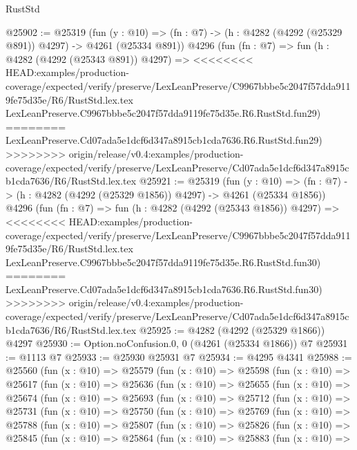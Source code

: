 \begin{lexlean}{RustStd}
\begin{coremodule}
{\begin{coremodule}
{{{{{{{{{{{{{{{{{{{{{{{{{{{{{{{{{{{@25902 := @25319
    (fun (y : @10) => (fn : @7) -> (h : @4282 (@4292 (@25329 @891)) @4297) -> @4261 (@25334 @891))
    @4296
    (fun (fn : @7) =>
    fun (h : @4282 (@4292 (@25343 @891)) @4297) =>
<<<<<<<< HEAD:examples/production-coverage/expected/verify/preserve/LexLeanPreserve/C9967bbbe5c2047f57dda9119fe75d35e/R6/RustStd.lex.tex
    LexLeanPreserve.C9967bbbe5c2047f57dda9119fe75d35e.R6.RustStd.fun29)
========
    LexLeanPreserve.Cd07ada5e1dcf6d347a8915cb1cda7636.R6.RustStd.fun29)
>>>>>>>> origin/release/v0.4:examples/production-coverage/expected/verify/preserve/LexLeanPreserve/Cd07ada5e1dcf6d347a8915cb1cda7636/R6/RustStd.lex.tex
@25921 := @25319
    (fun (y : @10) => (fn : @7) -> (h : @4282 (@4292 (@25329 @1856)) @4297) -> @4261 (@25334 @1856))
    @4296
    (fun (fn : @7) =>
    fun (h : @4282 (@4292 (@25343 @1856)) @4297) =>
<<<<<<<< HEAD:examples/production-coverage/expected/verify/preserve/LexLeanPreserve/C9967bbbe5c2047f57dda9119fe75d35e/R6/RustStd.lex.tex
    LexLeanPreserve.C9967bbbe5c2047f57dda9119fe75d35e.R6.RustStd.fun30)
========
    LexLeanPreserve.Cd07ada5e1dcf6d347a8915cb1cda7636.R6.RustStd.fun30)
>>>>>>>> origin/release/v0.4:examples/production-coverage/expected/verify/preserve/LexLeanPreserve/Cd07ada5e1dcf6d347a8915cb1cda7636/R6/RustStd.lex.tex
@25925 := @4282 (@4292 (@25329 @1866)) @4297
@25930 := Option.noConfusion.{0, 0} (@4261 (@25334 @1866)) @7
@25931 := @1113 @7
@25933 := @25930 @25931 @7
@25934 := @4295 @4341
@25988 := @25560
    (fun (x : @10) =>
    @25579
      (fun (x : @10) =>
      @25598
        (fun (x : @10) =>
        @25617
          (fun (x : @10) =>
          @25636
            (fun (x : @10) =>
            @25655
              (fun (x : @10) =>
              @25674
                (fun (x : @10) =>
                @25693
                  (fun (x : @10) =>
                  @25712
                    (fun (x : @10) =>
                    @25731
                      (fun (x : @10) =>
                      @25750
                        (fun (x : @10) =>
                        @25769
                          (fun (x : @10) =>
                          @25788
                            (fun (x : @10) =>
                            @25807
                              (fun (x : @10) =>
                              @25826
                                (fun (x : @10) =>
                                @25845
                                  (fun (x : @10) =>
                                  @25864
                                    (fun (x : @10) =>
                                    @25883
                                      (fun (x : @10) =>
}}}}}}}}}}}}}}}}}}}}}}}}}}}}}}}}}}}
\end{coremodule}}
\end{coremodule}
\end{lexlean}
